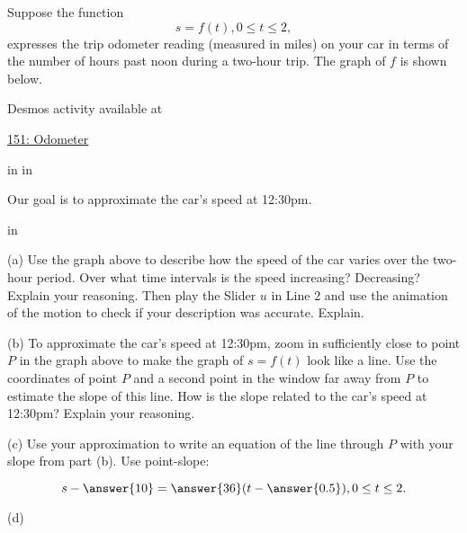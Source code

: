 \documentclass{ximera}
\newcommand{\pskip}{\vskip 0.1 in}
\begin{document}
\begin{example} \label{Ex:ldfdtgjh5}
Suppose the function
\[
    s = f(t) , 0\leq t \leq 2 ,
\]
expresses the trip odometer reading (measured in miles) on your car in terms of the number of hours past noon during a two-hour trip. The graph of $f$  is shown below.

 
\begin{onlineOnly}
    \begin{center}
\end{center}
\end{onlineOnly}

Desmos activity available at

\href{https://www.desmos.com/calculator/tumgpu4n0w}{151: Odometer}

\pskip \pskip

Our goal is to approximate the car's speed at 12:30pm.

\pskip

(a) Use the graph above to describe how the speed of the car varies over the two-hour period. Over what time intervals is the speed increasing? Decreasing? Explain your reasoning. Then play the Slider $u$ in Line 2 and use the animation of the motion to check if your description was accurate. Explain.

(b) To approximate the car's speed at 12:30pm, zoom in sufficiently close to point $P$ in the graph above to make the graph of $s=f(t)$ look like a line. Use the coordinates of point $P$ and a second point in the window far away from $P$ to estimate the slope of this line. How is the slope related to the car's speed at 12:30pm? Explain your reasoning.

(c) Use your approximation to write an equation of the line through $P$ with your slope from part (b). Use point-slope:
\begin{question}  \label{Q:3422d3}
\[
     s - \answer{10} = \answer{36}(t - \answer{0.5}) , 0\leq t \leq 2 .
\]
\end{question}

(d) 

\end{example}
\end{document}
